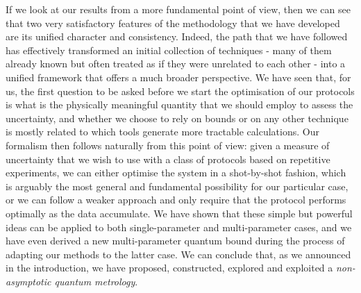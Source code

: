 If we look at our results from a more fundamental point of view, then we can see that two very satisfactory features of the methodology that we have developed are its unified character and consistency. Indeed, the path that we have followed has effectively transformed an initial collection of techniques - many of them already known but often treated as if they were unrelated to each other - into a unified framework that offers a much broader perspective. We have seen that, for us, the first question to be asked before we start the optimisation of our protocols is what is the physically meaningful quantity that we should employ to assess the uncertainty, and whether we choose to rely on bounds or on any other technique is mostly related to which tools generate more tractable calculations. Our formalism then follows naturally from this point of view: given a measure of uncertainty that we wish to use with a class of protocols based on repetitive experiments, we can either optimise the system in a shot-by-shot fashion, which is arguably the most general and fundamental possibility for our particular case, or we can follow a weaker approach and only require that the protocol performs optimally as the data accumulate. We have shown that these simple but powerful ideas can be applied to both single-parameter and multi-parameter cases, and we have even derived a new multi-parameter quantum bound during the process of adapting our methods to the latter case. We can conclude that, as we announced in the introduction, we have proposed, constructed, explored and exploited a \emph{non-asymptotic quantum metrology}.